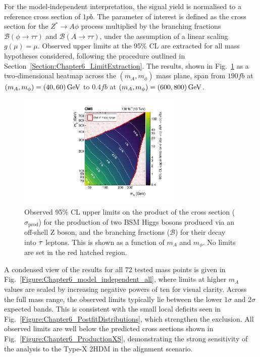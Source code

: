 For the model‑independent interpretation, the signal yield is normalised to a reference cross section of $1\unit{pb}$. The parameter of interest is defined as the cross section for the $Z^* \to A\phi$ process multiplied by the branching fractions $\mathcal{B}(\phi \to \tau\tau)$ and $\mathcal{B}(A \to \tau\tau)$, under the assumption of a linear scaling $g(\mu) = \mu$. Observed upper limits at the 95\% CL are extracted for all mass hypotheses considered, following the procedure outlined in Section~\ref{Section:Chapter6_LimitExtraction}. The results, shown in Fig.~\ref{Figure:Chapter6_model_independent} as a two‑dimensional heatmap across the $(m_A, m_\phi)$ mass plane, span from $190\unit{fb}$ at $(m_A, m_\phi) = (40, 60)\,\text{Ge\hspace{-.08em}V}$ to $0.4\unit{fb}$ at $(m_A, m_\phi) = (600, 800)\,\text{Ge\hspace{-.08em}V}$.

\begin{figure}[!htbp]
    \centering        
    \includegraphics[width=0.7\textwidth]{Figures/Chapter6/mi_2d.pdf}
    \caption[Observed 95\% CL upper limits on $\sigma_\text{prod} \times \mathcal{B}(\phi\to\tau\tau)\times\mathcal{B}(A\to\tau\tau)$]{Observed 95\% CL upper limits on the product of the cross section ($\sigma_\text{prod}$) for the production of two \ac{BSM} Higgs bosons produced via an off-shell Z boson, and the branching fractions ($\mathcal{B}$) for their decay into $\tau$ leptons. This is shown as a function of $m_A$ and $m_\phi$. No limits are set in the red hatched region.}
    \label{Figure:Chapter6_model_independent}
\end{figure}

A condensed view of the results for all 72 tested mass points is given in Fig.~\ref{Figure:Chapter6_model_independent_all}, where limits at higher $m_A$ values are scaled by increasing negative powers of ten for visual clarity.  Across the full mass range, the observed limits typically lie between the lower $1\sigma$ and $2\sigma$ expected bands. This is consistent with the small local deficits seen in Fig.~\ref{Figure:Chapter6_PostfitDistributions}, which strengthen the exclusion. All observed limits are well below the predicted cross sections shown in Fig.~\ref{Figure:Chapter6_ProductionXS}, demonstrating the strong sensitivity of the analysis to the Type-X \ac{2HDM} in the alignment scenario.

